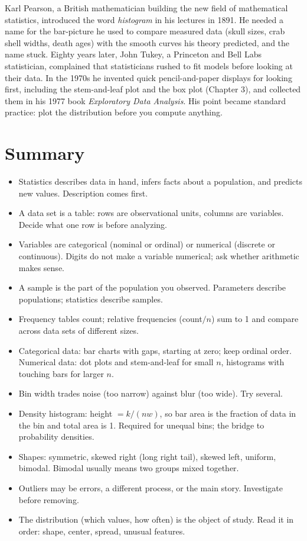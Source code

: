 \begin{historybox}
Karl Pearson, a British mathematician building the new field of mathematical statistics,
introduced the word \emph{histogram} in his lectures in 1891. He needed a name for the
bar-picture he used to compare measured data (skull sizes, crab shell widths, death ages)
with the smooth curves his theory predicted, and the name stuck. Eighty years later, John
Tukey, a Princeton and Bell Labs statistician, complained that statisticians rushed to fit
models before looking at their data. In the 1970s he invented quick pencil-and-paper displays
for looking first, including the stem-and-leaf plot and the box plot (Chapter 3), and collected
them in his 1977 book \emph{Exploratory Data Analysis}. His point became standard practice:
plot the distribution before you compute anything.
\end{historybox}


\section{Summary}
\label{sec:data-summary}

\begin{itemize}
  \item Statistics describes data in hand, infers facts about a population, and predicts new
  values. Description comes first.
  \item A data set is a table: rows are observational units, columns are variables. Decide
  what one row is before analyzing.
  \item Variables are categorical (nominal or ordinal) or numerical (discrete or continuous).
  Digits do not make a variable numerical; ask whether arithmetic makes sense.
  \item A sample is the part of the population you observed. Parameters describe populations;
  statistics describe samples.
  \item Frequency tables count; relative frequencies (count$/n$) sum to 1 and compare across
  data sets of different sizes.
  \item Categorical data: bar charts with gaps, starting at zero; keep ordinal order.
  Numerical data: dot plots and stem-and-leaf for small $n$, histograms with touching bars for
  larger $n$.
  \item Bin width trades noise (too narrow) against blur (too wide). Try several.
  \item Density histogram: height $= k/(nw)$, so bar area is the fraction of data in the bin and
  total area is 1. Required for unequal bins; the bridge to probability densities.
  \item Shapes: symmetric, skewed right (long right tail), skewed left, uniform, bimodal.
  Bimodal usually means two groups mixed together.
  \item Outliers may be errors, a different process, or the main story. Investigate before
  removing.
  \item The distribution (which values, how often) is the object of study. Read it in order:
  shape, center, spread, unusual features.
\end{itemize}

